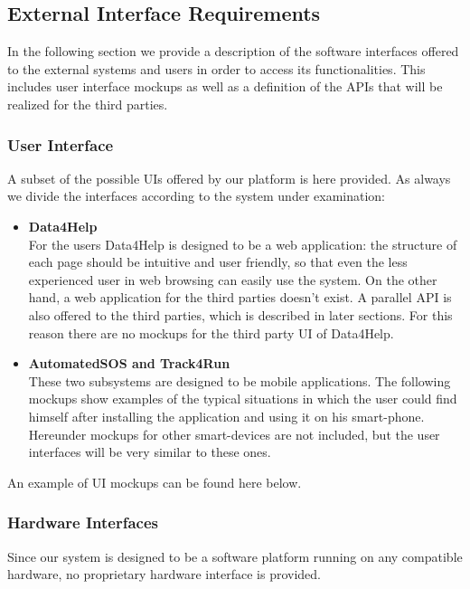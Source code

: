 \subsection{External Interface Requirements}
In the following section we provide a description of the software interfaces  offered to the external systems and users in order to access its functionalities. This includes user interface mockups as well as a definition of the APIs that will be realized for the third parties.

\subsubsection{User Interface}
A subset of the possible UIs offered by our platform is here provided. As always we divide the interfaces according to the system under examination:

\begin{itemize}
	\item \textbf{Data4Help} \\
	For the users Data4Help is designed to be a web application: the structure of each page should be intuitive and user friendly, so that even the less experienced user in web browsing can easily use the system.
	On the other hand, a web application for the third parties doesn't exist. A parallel API is also offered to the third parties, which is described in later sections. For this reason there are no mockups for the third party UI of Data4Help.

	\item \textbf{AutomatedSOS and Track4Run} \\ 
	These two subsystems are designed to be mobile applications. The following mockups show examples of the typical situations in which the user could find himself after installing the application and using it on his smart-phone. Hereunder mockups for other smart-devices are not included, but the user interfaces will be very similar to these ones. 
\end{itemize}

An example of UI mockups can be found here below.

\FloatBarrier

\FloatBarrier

\subsubsection{Hardware Interfaces}
Since our system is designed to be a software platform running on any compatible hardware, no proprietary hardware interface is provided.

